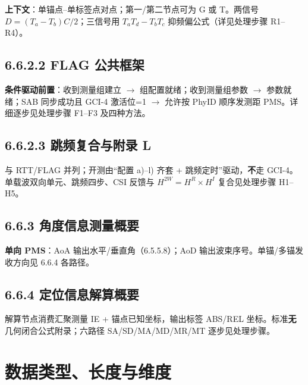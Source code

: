 \documentclass[11pt,a4paper]{ctexart}
\begin{document}
\textbf{上下文}：单锚点--单标签点对点；第一/第二节点可为 G 或 T。两信号 $D=(T_a-T_b)C/2$；三信号用 $T_a T_d-T_b T_c$ 抑频偏公式（详见处理步骤 R1--R4）。

\subsection{6.6.2.2 FLAG 公共框架}

\textbf{条件驱动前置}：收到测量组建立 $\rightarrow$ 组配置就绪；收到测量组参数 $\rightarrow$ 参数就绪；SAB 同步成功且 GCI-4 激活位=1 $\rightarrow$ 允许按 PhyID 顺序发测距 PMS。详细逐步见处理步骤 F1--F3 及四种方法。

\subsection{6.6.2.3 跳频复合与附录 L}

与 RTT/FLAG 并列；开测由``配置 a)--l) 齐套 + 跳频定时''驱动，\textbf{不}走 GCI-4。单载波双向单元、跳频四步、CSI 反馈与 $H^{2W}=H^{R}\times H^{I}$ 复合见处理步骤 H1--H5。

\subsection{6.6.3 角度信息测量概要}

\textbf{单向 PMS}：AoA 输出水平/垂直角（6.5.5.8）；AoD 输出波束序号。单锚/多锚发收方向见 6.6.4 各路径。

\subsection{6.6.4 定位信息解算概要}

解算节点消费汇聚测量 IE + 锚点已知坐标，输出标签 ABS/REL 坐标。标准\textbf{无}几何闭合公式附录；六路径 SA/SD/MA/MD/MR/MT 逐步见处理步骤。




\section{数据类型、长度与维度}
\end{document}
